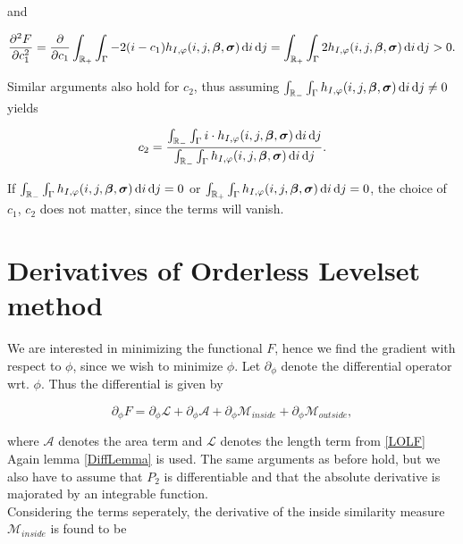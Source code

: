 and 

\begin{equation}
  \frac{\partial^2 F}{\partial c_1^2} = \frac{\partial}{\partial c_1}\int_{\mathbb R_+}\int_{\Gamma}-2(i-c_1) h_{I,\varphi}(i,j,\boldsymbol{\beta} ,\boldsymbol{\sigma} ) \,{\rm d} i\,{\rm d} j = \int_{\mathbb R_+}\int_{\Gamma}2 h_{I,\varphi}(i,j,\boldsymbol{\beta} ,\boldsymbol{\sigma} ) \,{\rm d} i\,{\rm d} j>0.
\end{equation}

Similar arguments also hold for $c_2$, thus assuming $\int_{\mathbb R_-}\int_{\Gamma}h_{I,\varphi}(i,j,\boldsymbol{\beta} ,\boldsymbol{\sigma} ) \,{\rm d} i\,{\rm d} j\neq 0$ yields

\begin{equation}
  c_2 = \frac{\int_{\mathbb R_-}\int_{\Gamma} i\cdot h_{I,\varphi}(i,j,\boldsymbol{\beta} ,\boldsymbol{\sigma} ) \,{\rm d} i\,{\rm d} j}{\int_{\mathbb R_-}\int_{\Gamma}h_{I,\varphi}(i,j,\boldsymbol{\beta} ,\boldsymbol{\sigma} ) \,{\rm d} i\,{\rm d} j}.
\end{equation}

If $\int_{\mathbb R_-}\int_{\Gamma}h_{I,\varphi}(i,j,\boldsymbol{\beta} ,\boldsymbol{\sigma} ) \,{\rm d} i\,{\rm d} j=0$ or $\int_{\mathbb R_+}\int_{\Gamma}h_{I,\varphi}(i,j,\boldsymbol{\beta} ,\boldsymbol{\sigma} ) \,{\rm d} i\,{\rm d} j = 0$, the choice of $c_1$, $c_2$ does not matter, since the terms will vanish.


\section{Derivatives of Orderless Levelset method}\label{section:OLder}
We are interested in minimizing the functional $F$, hence we find the gradient with respect to $\phi$, since we wish to minimize $\phi$. Let $\partial_\phi$ denote the differential operator wrt. $\phi$. Thus the differential is given by

\begin{equation}
  \partial_\phi F = \partial_\phi \mathcal{L} + \partial_\phi \mathcal{A} + \partial_\phi\mathcal{M}_{inside} + \partial_\phi \mathcal{M}_{outside},
\end{equation}

where $\mathcal{A}$ denotes the area term and $\mathcal{L}$ denotes the length term from \eqref{LOLF}\\

Again lemma \ref{DiffLemma} is used. The same arguments as before hold, but we also have to assume that $P_2$ is differentiable and that the absolute derivative is majorated by an integrable function.\\
Considering the terms seperately, the derivative of the inside similarity measure $\mathcal{M}_{inside}$ is found to be

